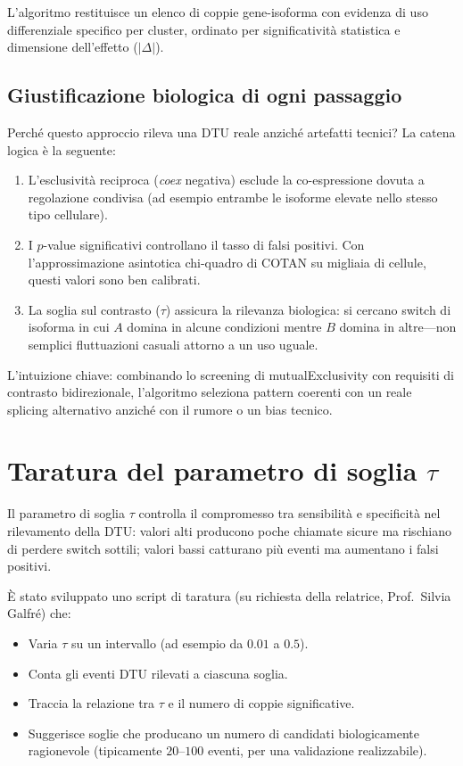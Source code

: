 L'algoritmo restituisce un elenco di coppie gene-isoforma con evidenza di uso differenziale specifico per cluster, ordinato per significatività statistica e dimensione dell'effetto ($|\Delta|$).

\subsection*{Giustificazione biologica di ogni passaggio}

Perché questo approccio rileva una DTU reale anziché artefatti tecnici? La catena logica è la seguente:

\begin{enumerate}
    \item L'esclusività reciproca (\textit{coex} negativa) esclude la co-espressione dovuta a regolazione condivisa (ad esempio entrambe le isoforme elevate nello stesso tipo cellulare).
    \item I $p$-value significativi controllano il tasso di falsi positivi. Con l'approssimazione asintotica chi-quadro di COTAN su migliaia di cellule, questi valori sono ben calibrati.
    \item La soglia sul contrasto ($\tau$) assicura la rilevanza biologica: si cercano switch di isoforma in cui $A$ domina in alcune condizioni mentre $B$ domina in altre---non semplici fluttuazioni casuali attorno a un uso uguale.
\end{enumerate}

L'intuizione chiave: combinando lo screening di \gls{mutualExclusivity} con requisiti di contrasto bidirezionale, l'algoritmo seleziona pattern coerenti con un reale splicing alternativo anziché con il rumore o un bias tecnico.

\section{Taratura del parametro di soglia \texorpdfstring{$\tau$}{tau}}\label{sec:tuning-tau}

Il parametro di soglia $\tau$ controlla il compromesso tra sensibilità e specificità nel rilevamento della DTU: valori alti producono poche chiamate sicure ma rischiano di perdere switch sottili; valori bassi catturano più eventi ma aumentano i falsi positivi.

È stato sviluppato uno script di taratura (su richiesta della relatrice, Prof.\ Silvia Galfr\'e) che:

\begin{itemize}
    \item Varia $\tau$ su un intervallo (ad esempio da $0.01$ a $0.5$).
    \item Conta gli eventi DTU rilevati a ciascuna soglia.
    \item Traccia la relazione tra $\tau$ e il numero di coppie significative.
    \item Suggerisce soglie che producano un numero di candidati biologicamente ragionevole (tipicamente $20$--$100$ eventi, per una validazione realizzabile).
\end{itemize}

